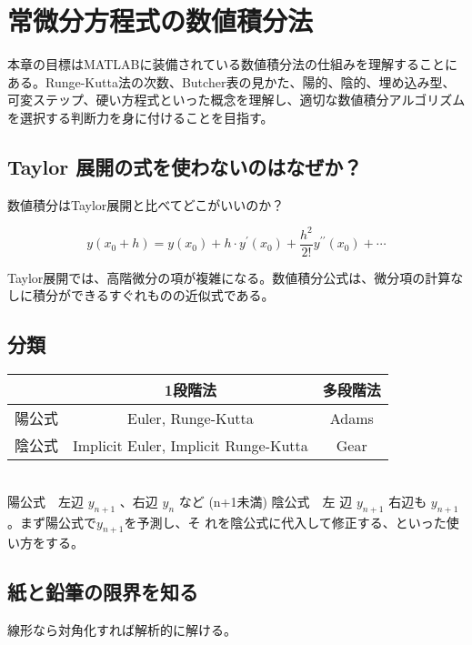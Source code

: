 \chapter{常微分方程式の数値積分法}
本章の目標はMATLABに装備されている数値積分法の仕組みを理解することにある。Runge-Kutta法の次数、Butcher表の見かた、陽的、陰的、埋め込み型、可変ステップ、硬い方程式といった概念を理解し、適切な数値積分アルゴリズムを選択する判断力を身に付けることを目指す。

\section{Taylor 展開の式を使わないのはなぜか？}
数値積分はTaylor展開と比べてどこがいいのか？

\[y(x_0 + h) = y(x_0) + h \cdot y^{\prime}(x_0) + \frac{h^2}{2!} y^{\prime  \prime}(x_0) + \cdots\]

Taylor展開では、高階微分の項が複雑になる。数値積分公式は、微分項の計算なしに積分ができるすぐれものの近似式である。

\section{分類}
\begin{tabular}{l||c|c}
      & 1段階法               & 多段階法 \\
\hline
陽公式 & Euler, Runge-Kutta   & Adams \\
\hline
陰公式 & Implicit Euler, Implicit Runge-Kutta   & Gear \\
\hline
\end{tabular}
\\

陽公式　左辺 \(y_{n+1}\) 、右辺 \(y_{n}\) など (n+1未満) 陰公式　左
辺 \(y_{n+1}\) 右辺も \(y_{n+1}\)。まず陽公式で\(y_{n+1}\)を予測し、そ
れを陰公式に代入して修正する、といった使い方をする。


\section{紙と鉛筆の限界を知る}
線形なら対角化すれば解析的に解ける。

